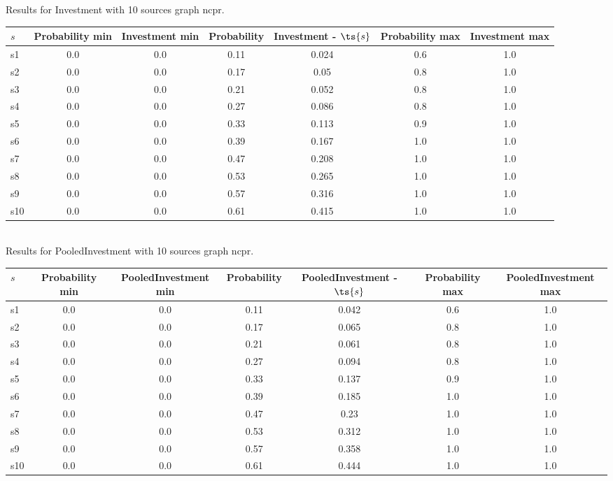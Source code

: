 \documentclass{article}
\begin{document}
\noindent Results for Investment with 10 sources graph ncpr.

\noindent\begin{tabular}{|l|c|c|c|c|c|c|}
\hline
$s$& Probability min & Investment min & Probability & Investment - $\ts{s}$ & Probability max & Investment max\\
\hline
s1 &0.0 & 0.0 & 0.11 & 0.024 & 0.6 & 1.0\\
\hline
s2 &0.0 & 0.0 & 0.17 & 0.05 & 0.8 & 1.0\\
\hline
s3 &0.0 & 0.0 & 0.21 & 0.052 & 0.8 & 1.0\\
\hline
s4 &0.0 & 0.0 & 0.27 & 0.086 & 0.8 & 1.0\\
\hline
s5 &0.0 & 0.0 & 0.33 & 0.113 & 0.9 & 1.0\\
\hline
s6 &0.0 & 0.0 & 0.39 & 0.167 & 1.0 & 1.0\\
\hline
s7 &0.0 & 0.0 & 0.47 & 0.208 & 1.0 & 1.0\\
\hline
s8 &0.0 & 0.0 & 0.53 & 0.265 & 1.0 & 1.0\\
\hline
s9 &0.0 & 0.0 & 0.57 & 0.316 & 1.0 & 1.0\\
\hline
s10 &0.0 & 0.0 & 0.61 & 0.415 & 1.0 & 1.0\\
\hline
\end{tabular}\\

\noindent Results for PooledInvestment with 10 sources graph ncpr.

\noindent\begin{tabular}{|l|c|c|c|c|c|c|}
\hline
$s$& Probability min & PooledInvestment min & Probability & PooledInvestment - $\ts{s}$ & Probability max & PooledInvestment max\\
\hline
s1 &0.0 & 0.0 & 0.11 & 0.042 & 0.6 & 1.0\\
\hline
s2 &0.0 & 0.0 & 0.17 & 0.065 & 0.8 & 1.0\\
\hline
s3 &0.0 & 0.0 & 0.21 & 0.061 & 0.8 & 1.0\\
\hline
s4 &0.0 & 0.0 & 0.27 & 0.094 & 0.8 & 1.0\\
\hline
s5 &0.0 & 0.0 & 0.33 & 0.137 & 0.9 & 1.0\\
\hline
s6 &0.0 & 0.0 & 0.39 & 0.185 & 1.0 & 1.0\\
\hline
s7 &0.0 & 0.0 & 0.47 & 0.23 & 1.0 & 1.0\\
\hline
s8 &0.0 & 0.0 & 0.53 & 0.312 & 1.0 & 1.0\\
\hline
s9 &0.0 & 0.0 & 0.57 & 0.358 & 1.0 & 1.0\\
\hline
s10 &0.0 & 0.0 & 0.61 & 0.444 & 1.0 & 1.0\\
\hline
\end{tabular}\\
\end{document}
